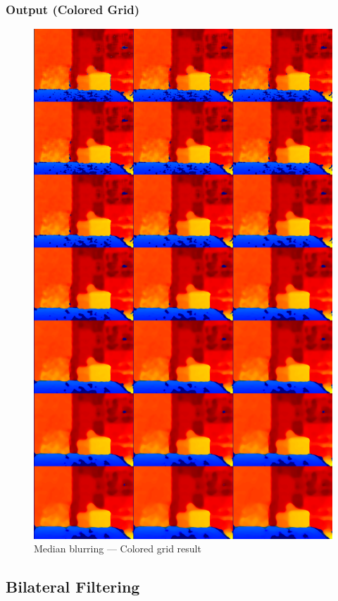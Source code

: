 \documentclass[a4paper,11pt]{article}
\begin{document}
	\subsubsection*{Output (Colored Grid)}
	\begin{figure}[H]
		\centering
		\includegraphics[width=\textwidth,height=0.9\textheight,keepaspectratio]{Images/blur/06_median_colored_grid.png}
		\caption{Median blurring — Colored grid result}
	\end{figure}
	\clearpage
	
	\subsection{Bilateral Filtering}
\end{document}
